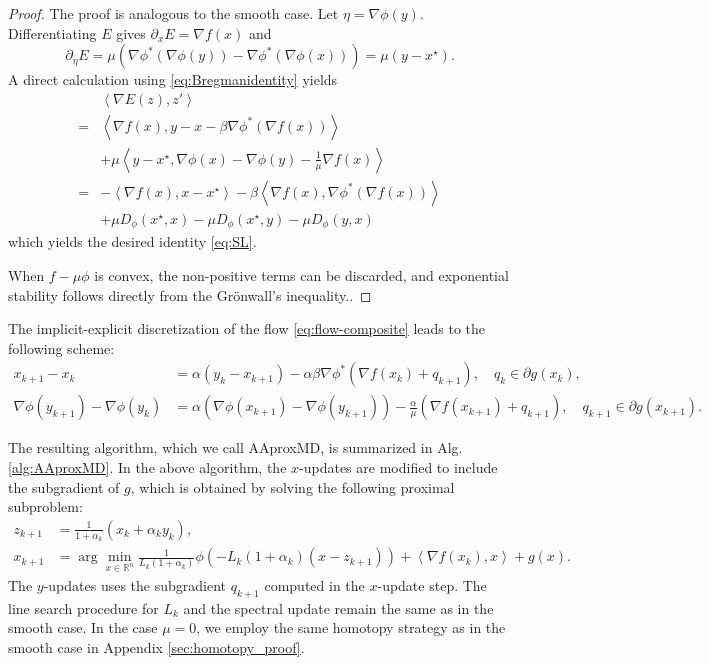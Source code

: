 \documentclass{article}
\newcommand{\dual}[1]{\left\langle {#1} \right\rangle}
\theoremstyle{plain}
\theoremstyle{definition}
\theoremstyle{remark}
\begin{document}
\begin{proof}
The proof is analogous to the smooth case. Let $\eta = \nabla\phi(y)$. Differentiating $E$ gives $\partial_x E = \nabla f(x)$ and 
$$\partial_\eta E = \mu (\nabla \phi^*(\nabla \phi(y)) - \nabla \phi^*(\nabla \phi(x))) = \mu(y - x^\star).$$
A direct calculation using \eqref{eq:Bregmanidentity} yields
\[
\begin{aligned}
&\dual{\nabla E(z), z'}\\
={}&\dual{\nabla f(x),y-x-\beta\nabla\phi^*(\nabla f(x))} \\
&+\mu\dual{y-x^\star,\nabla\phi(x)-\nabla\phi(y)-\tfrac1\mu\nabla f(x)} \\
={}& -\dual{\nabla f(x),x-x^\star}
-\beta\dual{\nabla f(x),\nabla\phi^*(\nabla f(x))} \\
&+\mu D_\phi(x^\star,x)-\mu D_\phi(x^\star,y)-\mu D_\phi(y,x)
\end{aligned}
\]
which yields the desired identity \eqref{eq:SL}.

When $f-\mu\phi$ is convex, the non-positive terms can be discarded, and exponential stability follows directly from the Gr{\"o}nwall's inequality..%
\end{proof}

The implicit-explicit discretization of the flow \eqref{eq:flow-composite} leads to the following scheme:
\begin{equation}\label{eq:discrete-composite}
\begin{aligned}
    x_{k+1} -x_k &= \alpha(y_k - x_{k+1}) - \alpha \beta \nabla \phi^*(\nabla f(x_k) + q_{k+1}), \quad q_k \in \partial g(x_k), \\
    \nabla \phi(y_{k+1}) - \nabla \phi(y_k)&= \alpha(\nabla \phi(x_{k+1})-\nabla\phi(y_{k+1})) - \frac{\alpha}{\mu}(\nabla f(x_{k+1}) + q_{k+1}), \quad q_{k+1} \in \partial g(x_{k+1}).
\end{aligned}
\end{equation}

The resulting algorithm, which we call AAproxMD, is summarized in Alg. \ref{alg:AAproxMD}. In the above algorithm, the $x$-updates are modified to include the subgradient of $g$, which is obtained by solving the following proximal subproblem:
\begin{equation}\label{eq:proxsubproblem}
  \begin{aligned}
     z_{k+1} &{}= \frac{1}{1+\alpha_k}(x_k+\alpha_k y_k),\\
    x_{k+1} &{}= \arg\min_{x\in\mathbb{R}^n} \frac{1}{L_k(1+\alpha_k)}\phi\left(-L_k(1+\alpha_k)\left(x-z_{k+1}\right)\right)+\dual{\nabla f(x_{k}),x}+g(x).
  \end{aligned}
\end{equation}
The $y$-updates uses the subgradient $q_{k+1}$ computed in the $x$-update step. The line search procedure for $L_k$ and the spectral update remain the same as in the smooth case. In the case $\mu=0$, we employ the same homotopy strategy as in the smooth case in Appendix \ref{sec:homotopy_proof}.
\end{document}
